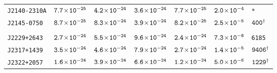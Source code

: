 \begin{longtable}{ l | c | c | c | c | c | l }
\scriptsize{\tt{J2140-2310A}} & \scriptsize{$\tt{7.7\!\times\!10^{-25}}$} & \scriptsize{$\tt{4.2\!\times\!10^{-24}}$} &
\scriptsize{$\tt{3.6\!\times\!10^{-24}}$} & \scriptsize{$\tt{7.7\!\times\!10^{-25}}$} & \scriptsize{$\tt{2.0\!\times\!10^{-4}}$} &
\scriptsize{\tt{*}} \\[-16pt] 
\scriptsize{\tt{J2145-0750}} & \scriptsize{$\tt{8.7\!\times\!10^{-25}}$} & \scriptsize{$\tt{8.3\!\times\!10^{-24}}$} &
\scriptsize{$\tt{3.9\!\times\!10^{-24}}$} & \scriptsize{$\tt{8.2\!\times\!10^{-25}}$} & \scriptsize{$\tt{2.5\!\times\!10^{-5}}$} &
\scriptsize{$\tt{400^{\dagger}}$} \\[-16pt] 
\\[-20pt]
\scriptsize{\tt{J2229+2643}} & \scriptsize{$\tt{2.7\!\times\!10^{-24}}$} & \scriptsize{$\tt{5.5\!\times\!10^{-24}}$} &
\scriptsize{$\tt{9.6\!\times\!10^{-24}}$} &\scriptsize{$\tt{2.4\!\times\!10^{-24}}$} & \scriptsize{$\tt{7.3\!\times\!10^{-6}}$} &
\scriptsize{\tt{6185}} \\[-16pt]
\scriptsize{\tt{J2317+1439}} & \scriptsize{$\tt{3.5\!\times\!10^{-24}}$} & \scriptsize{$\tt{4.6\!\times\!10^{-24}}$} &
\scriptsize{$\tt{7.9\!\times\!10^{-24}}$} & \scriptsize{$\tt{2.7\!\times\!10^{-24}}$} & \scriptsize{$\tt{1.4\!\times\!10^{-5}}$} &
\scriptsize{$\tt{9406^{\dagger}}$} \\[-16pt] 
\scriptsize{\tt{J2322+2057}} & \scriptsize{$\tt{1.6\!\times\!10^{-24}}$} & \scriptsize{$\tt{3.9\!\times\!10^{-24}}$} &
\scriptsize{$\tt{6.6\!\times\!10^{-24}}$} & \scriptsize{$\tt{1.2\!\times\!10^{-24}}$} & \scriptsize{$\tt{5.0\!\times\!10^{-6}}$} &
\scriptsize{$\tt{1229^{\dagger}}$} \\[-16pt]
\end{longtable}
